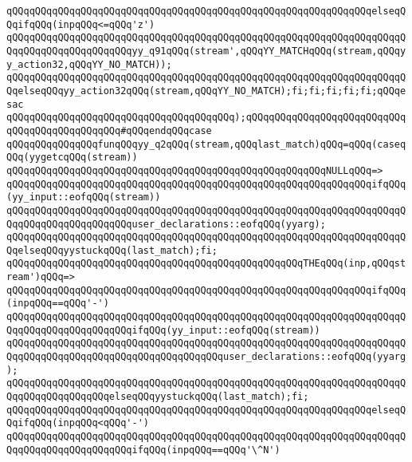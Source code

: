 \verb|qQQqqQQqqQQqqQQqqQQqqQQqqQQqqQQqqQQqqQQqqQQqqQQqqQQqqQQqqQQqqQQqelseqQQqifqQQq(inpqQQq<=qQQq'z')|\newline
\verb|qQQqqQQqqQQqqQQqqQQqqQQqqQQqqQQqqQQqqQQqqQQqqQQqqQQqqQQqqQQqqQQqqQQqqQQqqQQqqQQqqQQqqQQqqQQqyy_q91qQQq(stream',qQQqYY_MATCHqQQq(stream,qQQqyy_action32,qQQqYY_NO_MATCH));|\newline
\verb|qQQqqQQqqQQqqQQqqQQqqQQqqQQqqQQqqQQqqQQqqQQqqQQqqQQqqQQqqQQqqQQqqQQqqQQqelseqQQqyy_action32qQQq(stream,qQQqYY_NO_MATCH);fi;fi;fi;fi;fi;qQQqesac|\newline
\verb|qQQqqQQqqQQqqQQqqQQqqQQqqQQqqQQqqQQqqQQq);qQQqqQQqqQQqqQQqqQQqqQQqqQQqqQQqqQQqqQQqqQQqqQQq#qQQqendqQQqcase|\newline
\verb|qQQqqQQqqQQqqQQqfunqQQqyy_q2qQQq(stream,qQQqlast_match)qQQq=qQQq(caseqQQq(yygetcqQQq(stream))|\newline
\verb|qQQqqQQqqQQqqQQqqQQqqQQqqQQqqQQqqQQqqQQqqQQqqQQqqQQqqQQqNULLqQQq=>|\newline
\verb|qQQqqQQqqQQqqQQqqQQqqQQqqQQqqQQqqQQqqQQqqQQqqQQqqQQqqQQqqQQqqQQqifqQQq(yy_input::eofqQQq(stream))|\newline
\verb|qQQqqQQqqQQqqQQqqQQqqQQqqQQqqQQqqQQqqQQqqQQqqQQqqQQqqQQqqQQqqQQqqQQqqQQqqQQqqQQqqQQqqQQqqQQquser_declarations::eofqQQq(yyarg);|\newline
\verb|qQQqqQQqqQQqqQQqqQQqqQQqqQQqqQQqqQQqqQQqqQQqqQQqqQQqqQQqqQQqqQQqqQQqqQQqelseqQQqyystuckqQQq(last_match);fi;|\newline
\verb|qQQqqQQqqQQqqQQqqQQqqQQqqQQqqQQqqQQqqQQqqQQqqQQqqQQqTHEqQQq(inp,qQQqstream')qQQq=>|\newline
\verb|qQQqqQQqqQQqqQQqqQQqqQQqqQQqqQQqqQQqqQQqqQQqqQQqqQQqqQQqqQQqqQQqifqQQq(inpqQQq==qQQq'-')|\newline
\verb|qQQqqQQqqQQqqQQqqQQqqQQqqQQqqQQqqQQqqQQqqQQqqQQqqQQqqQQqqQQqqQQqqQQqqQQqqQQqqQQqqQQqqQQqqQQqifqQQq(yy_input::eofqQQq(stream))|\newline
\verb|qQQqqQQqqQQqqQQqqQQqqQQqqQQqqQQqqQQqqQQqqQQqqQQqqQQqqQQqqQQqqQQqqQQqqQQqqQQqqQQqqQQqqQQqqQQqqQQqqQQqqQQqqQQquser_declarations::eofqQQq(yyarg);|\newline
\verb|qQQqqQQqqQQqqQQqqQQqqQQqqQQqqQQqqQQqqQQqqQQqqQQqqQQqqQQqqQQqqQQqqQQqqQQqqQQqqQQqqQQqqQQqelseqQQqyystuckqQQq(last_match);fi;|\newline
\verb|qQQqqQQqqQQqqQQqqQQqqQQqqQQqqQQqqQQqqQQqqQQqqQQqqQQqqQQqqQQqqQQqelseqQQqifqQQq(inpqQQq<qQQq'-')|\newline
\verb|qQQqqQQqqQQqqQQqqQQqqQQqqQQqqQQqqQQqqQQqqQQqqQQqqQQqqQQqqQQqqQQqqQQqqQQqqQQqqQQqqQQqqQQqqQQqifqQQq(inpqQQq==qQQq'\^N')|\newline

